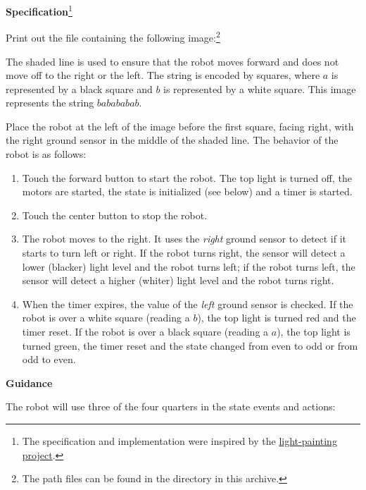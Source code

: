 \textbf{Specification}\footnote{The specification and implementation
were inspired by the \href{https://www.thymio.org/en:barcodelightpainting}{light-painting project}.}

Print out the file  containing the
following image:\footnote{The path files can be found in the directory
 in this archive.}


The shaded line is used to ensure that the robot moves forward and does
not move off to the right or the left. The string is encoded by squares,
where $a$ is represented by a black square and $b$ is represented by a
white square. This image represents the string $babababab$.

Place the robot at the left of the image before the first square, facing
right, with the right ground sensor in the middle of the shaded line.
The behavior of the robot is as follows:

\begin{enumerate}

\item Touch the forward button to start the robot. The top light is
turned off, the motors are started, the state is initialized (see below) and a timer is started.

\item Touch the center button to stop the robot.

\item The robot moves to the right. It uses the \emph{right} ground
sensor to detect if it starts to turn left or right. If the robot turns
right, the sensor will detect a lower (blacker) light level and the
robot turns left; if the robot turns left, the sensor will detect a
higher (whiter) light level and the robot turns right.

\item When the timer expires, the value of the \emph{left} ground sensor
is checked. If the robot is over a white square (reading a $b$), the top
light is turned red and the timer reset. If the robot is over a black
square (reading a $a$), the top light is turned green, the timer reset
and the state changed from even to odd or from odd to even.

\end{enumerate}


\textbf{Guidance}

The robot will use three of the four quarters in the state events and
actions:

